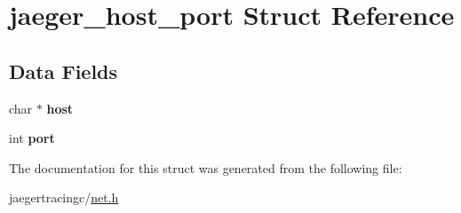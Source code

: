\hypertarget{structjaeger__host__port}{}\section{jaeger\+\_\+host\+\_\+port Struct Reference}
\label{structjaeger__host__port}
\subsection*{Data Fields}
\begin{DoxyCompactItemize}
\item 
\mbox{\label{structjaeger__host__port_af0dd78d71f61efd2834cbe2ade69aae2}} 
char $\ast$ {\bfseries host}
\item 
\mbox{\label{structjaeger__host__port_a1b326a3a83c046429052e71560a16c8e}} 
int {\bfseries port}
\end{DoxyCompactItemize}


The documentation for this struct was generated from the following file\+:\begin{DoxyCompactItemize}
\item 
jaegertracingc/\mbox{\hyperlink{net_8h}{net.\+h}}\end{DoxyCompactItemize}
